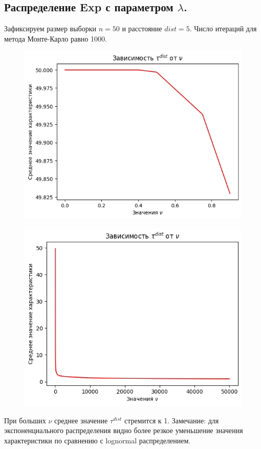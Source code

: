 \documentclass{report}
\begin{document}
\subsection{Распределение Exp с параметром $\lambda$.}
Зафиксируем размер выборки $n = 50$ и расстояние $dist = 5$. Число итераций для метода Монте-Карло равно 1000.
\begin{figure}[h]
    \centering
    \includegraphics[width=0.5\linewidth]{7.png}
\end{figure}
\begin{figure}[h]
    \centering
    \includegraphics[width=0.5\linewidth]{8.png}
\end{figure}
\newline
\newline
При больших $\nu$ среднее значение $\tau^{dist}$ стремится к 1.
\newline
\newline
Замечание: для экспоненциального распределения видно более резкое уменьшение значения характеристики по сравнению с lognormal распределением.
\end{document}
